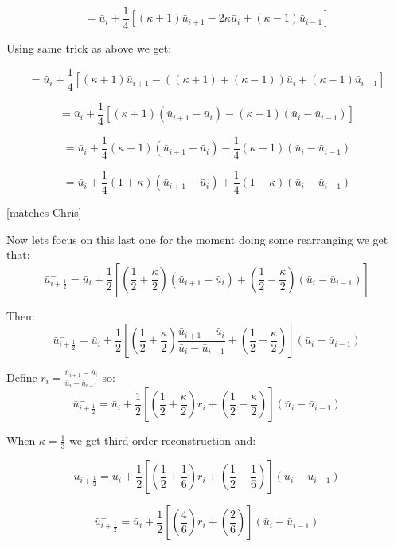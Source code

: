 \documentclass[12pt]{article}
\begin{document}
\[= \bar{u}_i +\frac{1}{4}\left[\left(\kappa + 1 \right)\bar{u}_{i+1} - 2\kappa \bar{u}_{i} + \left(\kappa -1 \right) \bar{u}_{i-1} \right]\]

Using same trick as above we get:

\[= \bar{u}_i +\frac{1}{4}\left[\left(\kappa + 1 \right)\bar{u}_{i+1} - \left((\kappa +1) + (\kappa - 1)\right) \bar{u}_{i} + \left(\kappa -1 \right) \bar{u}_{i-1} \right]\]

\[= \bar{u}_i +\frac{1}{4}\left[\left(\kappa + 1 \right)\left(\bar{u}_{i+1} - \bar{u}_{i}\right) - \left(\kappa -1 \right)\left(\bar{u}_{i} - \bar{u}_{i-1}\right) \right]\]

\[= \bar{u}_i +\frac{1}{4}\left(\kappa + 1 \right)\left(\bar{u}_{i+1} - \bar{u}_{i}\right) - \frac{1}{4}\left(\kappa -1 \right)\left(\bar{u}_{i} - \bar{u}_{i-1}\right) \]

\[= \bar{u}_i +\frac{1}{4}\left( 1 + \kappa\right)\left(\bar{u}_{i+1} - \bar{u}_{i}\right) + \frac{1}{4}\left( 1- \kappa \right)\left(\bar{u}_{i} - \bar{u}_{i-1}\right) \]

[matches Chris]

Now lets focus on this last one for the moment doing some rearranging we get that:
\[\bar{u}^-_{i + \frac{1}{2}} = \bar{u}_i + \frac{1}{2} \left[\left( \frac{1}{2} +\frac{\kappa}{2}\right)\left(\bar{u}_{i+1} - \bar{u}_{i}\right) + \left(\frac{1}{2} - \frac{\kappa}{2} \right)\left(\bar{u}_{i} - \bar{u}_{i-1}\right)\right] \]

Then:
\[\bar{u}^-_{i + \frac{1}{2}} = \bar{u}_i + \frac{1}{2} \left[\left( \frac{1}{2} +\frac{\kappa}{2}\right)\frac{\bar{u}_{i+1} - \bar{u}_{i}}{\bar{u}_{i} - \bar{u}_{i-1}} + \left(\frac{1}{2} - \frac{\kappa}{2} \right) \right] \left(\bar{u}_{i} - \bar{u}_{i-1}\right) \]

Define $r_i = \frac{\bar{u}_{i+1} - \bar{u}_{i}}{\bar{u}_{i} - \bar{u}_{i-1}} $ so:
\[\bar{u}^-_{i + \frac{1}{2}} = \bar{u}_i + \frac{1}{2} \left[\left( \frac{1}{2} +\frac{\kappa}{2}\right)r_i + \left(\frac{1}{2} - \frac{\kappa}{2} \right) \right] \left(\bar{u}_{i} - \bar{u}_{i-1}\right) \]

When $\kappa = \frac{1}{3}$ we get third order reconstruction and:

\[\bar{u}^-_{i + \frac{1}{2}} = \bar{u}_i + \frac{1}{2} \left[\left( \frac{1}{2} +\frac{1}{6}\right)r_i + \left(\frac{1}{2} - \frac{1}{6} \right) \right] \left(\bar{u}_{i} - \bar{u}_{i-1}\right) \]

\[\bar{u}^-_{i + \frac{1}{2}} = \bar{u}_i + \frac{1}{2} \left[\left(\frac{4}{6}\right)r_i + \left(\frac{2}{6} \right) \right] \left(\bar{u}_{i} - \bar{u}_{i-1}\right) \]
\end{document}
